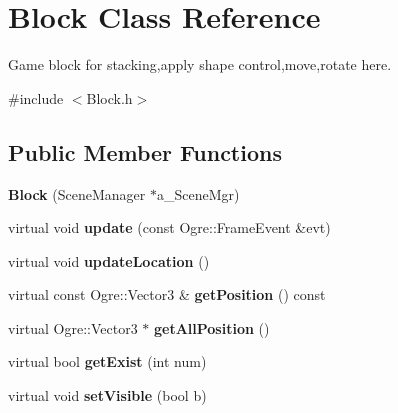 \hypertarget{class_block}{\section{Block Class Reference}
\label{class_block}
}


Game block for stacking,apply shape control,move,rotate here.  




{\ttfamily \#include $<$Block.\-h$>$}

\subsection*{Public Member Functions}
\begin{DoxyCompactItemize}
\item 
\hypertarget{class_block_a4bf11350657f21c4dcffe68bd624d150}{{\bfseries Block} (Scene\-Manager $\ast$a\-\_\-\-Scene\-Mgr)}\label{class_block_a4bf11350657f21c4dcffe68bd624d150}

\item 
\hypertarget{class_block_ad0a82dba858dc44e4e7dd194686cc5a8}{virtual void {\bfseries update} (const Ogre\-::\-Frame\-Event \&evt)}\label{class_block_ad0a82dba858dc44e4e7dd194686cc5a8}

\item 
\hypertarget{class_block_af2d5c039dae734db80e4b848759422d6}{virtual void {\bfseries update\-Location} ()}\label{class_block_af2d5c039dae734db80e4b848759422d6}

\item 
\hypertarget{class_block_a16c9ecdeeb71d126a00eed53083247ea}{virtual const Ogre\-::\-Vector3 \& {\bfseries get\-Position} () const }\label{class_block_a16c9ecdeeb71d126a00eed53083247ea}

\item 
\hypertarget{class_block_a352bbf7982b39bf1297747286bffe822}{virtual Ogre\-::\-Vector3 $\ast$ {\bfseries get\-All\-Position} ()}\label{class_block_a352bbf7982b39bf1297747286bffe822}

\item 
\hypertarget{class_block_ad1476f8033a35ef72e02bcaf058ae044}{virtual bool {\bfseries get\-Exist} (int num)}\label{class_block_ad1476f8033a35ef72e02bcaf058ae044}

\item 
\hypertarget{class_block_ae073b3711d637ffcb5d13edc67c6c96c}{virtual void {\bfseries set\-Visible} (bool b)}\label{class_block_ae073b3711d637ffcb5d13edc67c6c96c}


\end{DoxyCompactItemize}
